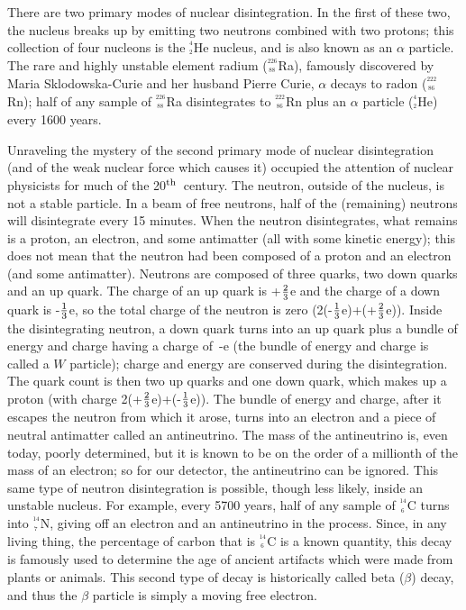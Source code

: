     There are two primary modes of nuclear disintegration.
In the first of these two, the nucleus breaks up by emitting
two neutrons combined with two protons; this collection of 
four nucleons is the $^{^{4}}_{^{2}}$He nucleus, and is 
also known as an $\alpha$ particle.  The rare and highly 
unstable element radium ($^{^{226}}_{^{~88}}$Ra), famously 
discovered by Maria Sklodowska-Curie and her husband Pierre 
Curie, $\alpha$ decays to radon ($^{^{222}}_{^{~86}}$Rn);
half of any sample of $^{^{226}}_{^{~88}}$Ra disintegrates 
to $^{^{222}}_{^{~86}}$Rn plus an $\alpha$ particle 
($^{^{4}}_{^{2}}$He) every 1600 years.

    Unraveling the mystery of the second primary mode of 
nuclear disintegration (and of the weak nuclear force which
causes it) occupied the attention of nuclear physicists for 
much of the 20$^{\rm th}$~century.  The neutron, outside of
the nucleus, is not a stable particle.  In a beam of free
neutrons, half of the (remaining) neutrons will disintegrate
every 15 minutes.  When the neutron disintegrates, what
remains is a proton, an electron, and some antimatter (all
with some kinetic energy); this does not mean that the
neutron had been composed of a proton and an electron (and some
antimatter).  Neutrons are composed of three quarks, two
down quarks and an up quark.  The charge of an up quark
is +$2\over 3$e and the charge of a down quark is -$1\over 3$e,
so the total charge of the neutron is zero 
\hbox{(2(-$1\over 3$e)+(+$2\over 3$e)).}  Inside the
disintegrating neutron, a down quark turns into an up quark 
plus a bundle of energy and charge having a charge of~-e
(the bundle of energy and charge is called a $W$ particle); 
charge and energy are conserved during the disintegration.  
The quark count is then two up quarks and one down quark,
which makes up a proton (with charge 
\hbox{2(+$2\over 3$e)+(-$1\over 3$e)).}  The bundle of energy 
and charge, after it escapes the neutron from which it arose, 
turns into an electron and a piece of neutral antimatter 
called an antineutrino.  The mass of the antineutrino is, even
today, poorly determined, but it is known to be on the order of 
a millionth of the mass of an electron; so for our detector, 
the antineutrino can be ignored.  This same type of neutron 
disintegration is possible, though less likely, inside 
an unstable nucleus.  For example, every 5700 years, half of 
any sample of $^{^{14}}_{^{~6}}$C turns into 
$^{^{14}}_{^{~7}}$N, giving off an electron and an 
antineutrino in the process.  Since, in any living thing, the 
percentage of carbon that is $^{^{14}}_{^{~6}}$C is a known 
quantity, this decay is famously used to determine the age of 
ancient artifacts which were made from plants or animals.  This
second type of decay is historically called beta ($\beta$) 
decay, and thus the $\beta$ particle is simply a moving free 
electron.

